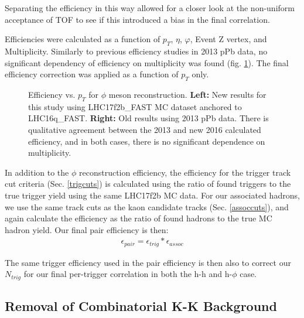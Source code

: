\documentclass[ALICE,manyauthors]{ALICE_analysis_notes}
\begin{document}
Separating the efficiency in this way allowed for a closer look at the non-uniform acceptance of TOF to see if this introduced a bias in the final correlation.

Efficiencies were calculated as a function of $p_T$, $\eta$, $\varphi$, Event Z vertex, and Multiplicity. Similarly to previous efficiency studies in 2013 pPb data, no significant dependency of efficiency on multiplicity was found (fig. \ref{oldeff}). The final efficiency correction was applied as a function of $p_T$ only.

\begin{figure}[ht]
\centering
\begin{subfigure}{
\texttt{[image: images/myeff\_pT.pdf]}}
\end{subfigure}
\begin{subfigure}{
\texttt{[image: images/2013\_efficiency\_analysisnote.pdf]}}
\end{subfigure}
\caption{Efficiency vs. $p_T$ for $\phi$ meson reconstruction.  \textbf{Left:} New results for this study using LHC17f2b\_FAST MC dataset anchored to LHC16q\_FAST. \textbf{Right:} Old results using 2013 pPb data.  There is qualitative agreement between the 2013 and new 2016 calculated efficiency, and in both cases, there is no significant dependence on multiplicity.}
\label{oldeff}
\end{figure}

In addition to the $\phi$ reconstruction efficiency, the efficiency for the trigger track cut criteria (Sec. \ref{trigcuts}) is calculated using the ratio of found triggers to the true trigger yield using the same LHC17f2b MC data.  For our associated hadrons, we use the same track cuts as the kaon candidate tracks (Sec. \ref{assoccuts}), and again calculate the efficiency as the ratio of found hadrons to the true MC hadron yield.  Our final pair efficiency is then:
\begin{align*}
    \epsilon_{pair} = \epsilon_{trig}*\epsilon_{assoc}
\end{align*}

The same trigger efficiency used in the pair efficiency is then also to correct our $N_{trig}$ for our final per-trigger correlation in both the h-h and h-$\phi$ case.

\subsection{Removal of Combinatorial K-K Background}
\label{removecomb}
\end{document}
